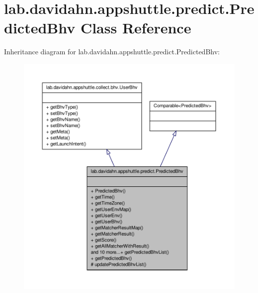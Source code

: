 \hypertarget{classlab_1_1davidahn_1_1appshuttle_1_1predict_1_1_predicted_bhv}{\section{lab.\-davidahn.\-appshuttle.\-predict.\-Predicted\-Bhv \-Class \-Reference}
\label{classlab_1_1davidahn_1_1appshuttle_1_1predict_1_1_predicted_bhv}
}


\-Inheritance diagram for lab.\-davidahn.\-appshuttle.\-predict.\-Predicted\-Bhv\-:
\nopagebreak
\begin{figure}[H]
\begin{center}
\leavevmode
\includegraphics[width=350pt]{classlab_1_1davidahn_1_1appshuttle_1_1predict_1_1_predicted_bhv__inherit__graph}
\end{center}
\end{figure}


